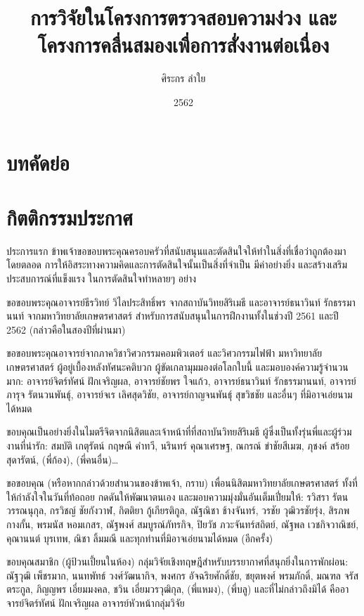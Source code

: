 \documentclass[16pt,a4]{internshipreport}
\title{การวิจัยในโครงการตรวจสอบความง่วง และโครงการคลื่นสมองเพื่อการสั่งงานต่อเนื่อง}
\date{2562}
\author{ศิระกร ลำใย}
\begin{document}
\maketitle

\chapter*{บทคัดย่อ}
\lipsum[2-4]

\chapter*{กิตติกรรมประกาศ}
ประการแรก ข้าพเจ้าขอขอบพระคุณครอบครัวที่สนับสนุนและตัดสินใจให้ทำในสิ่งที่เชื่อว่าถูกต้องมาโดยตลอด
การให้อิสระทางความคิดและการตัดสินใจนั้นเป็นสิ่งที่จำเป็น มีค่าอย่างยิ่ง และสร้างเสริมประสบการณ์ที่แข็งแรง
ในการตัดสินใจทำหลายๆ อย่าง

ขอขอบพระคุณอาจารย์ธีรวิทย์ วิไลประสิทธิ์พร จากสถาบันวิทยสิริเมธี และอาจารย์ธนาวินท์ รักธรรมานนท์
จากมหาวิทยาลัยเกษตรศาสตร์ สำหรับการสนับสนุนในการฝึกงานทั้งในช่วงปี 2561 และปี 2562 (กล่าวคือในสองปีที่ผ่านมา)

ขอขอบพระคุณอาจารย์จากภาควิชาวิศวกรรมคอมพิวเตอร์ และวิศวกรรมไฟฟ้า มหาวิทยาลัยเกษตรศาสตร์
ผู้อยู่เบื้องหลังทัศนะคติบวก ผู้ขัดเกลามุมมองต่อโลกใบนี้ และมอบองค์ความรู้จำนวนมาก: อาจารย์จิตร์ทัศน์ ฝักเจริญผล,
อาจารย์ชัยพร ใจแก้ว, อาจารย์ธนาวินท์ รักธรรมานนท์, อาจารย์ภารุจ รัตนวนพันธุ์, อาจารย์จเร เลิศสุดวิชัย,
อาจารย์กาญจนพันธุ์ สุขวิชชัย และอื่นๆ ที่มิอาจเอ่ยนามได้หมด

ขอบคุณเป็นอย่างยิ่งในไมตรีจิตจากนิสิตและเจ้าหน้าที่ที่สถาบันวิทยสิริเมธี ผู้ซึ่งเป็นทั้งรุ่นพี่และผู้ร่วมงานที่น่ารัก: สมบัติ เกตุรัตน์
กฤษณี คำทวี, นรินทร์ คุณาเศรษฐ, ณกรณ์ ขำชัยสีเมฆ, ภุชงค์ สร้อยสุดารัตน์, (พี่ก้อง), (พี่คนอื่น)\dots

ขอขอบคุณ (หรือหากกล่าวด้วยสำนวนของข้าพเจ้า, กราบ) เพื่อนนิสิตมหาวิทยาลัยเกษตรศาสตร์ ทั้งที่ให้กำลังใจในวันที่ท้อถอย
กดดันให้พัฒนาตนเอง และมอบความมุ่งมั่นอันเต็มเปี่ยมให้: รวิสรา รัตนวรรณนุกุล, กรวิชญ์ ชัยกังวาฬ,
กิตติยา กู้เกียรติกูล, ณัฐณิชา ช้างจันทร์, วรชัย วุฒิวรชัยรุ่ง, สิรภพ กางกั้น, พรมนัส หอมเกสร,
ณัฐพงศ์ สมบูรณ์ภัทรกิจ, ปิยวัช ภวะจันทร์สถิตย์, ณัฐพล เวชกิจวาณิชย์, คุณานนต์ บุรเทพ, ณิชา ลิ้มมณี
และทุกท่านที่มิอาจเอ่ยนามได้หมด (อีกครั้ง)

ขอบคุณสมาชิก (ผู้ป้วนเปี้ยนในห้อง) กลุ่มวิจัยเชิงทฤษฎีสำหรับบรรยากาศที่สนุกยิ่งในการพักผ่อน:
ณัฐวุฒิ เพ็ชรมาก, นนทพัทธ์ วงศ์วัฒนากิจ, พงศกร อัจฉริยศักดิ์ชัย, ชยุตพงศ์ พรมภักดิ์, มณฑล จรัสตระกูล,
ภิญญพร เอี่ยมมงคล, ชวิน เอี่ยมวรวุฒิกุล, (พี่แหมง), (พี่บลู) และที่ไม่กล่าวถึงมิได้
คืออาจารย์จิตร์ทัศน์ ฝักเจริญผล อาจารย์หัวหน้ากลุ่มวิจัย
\end{document}
